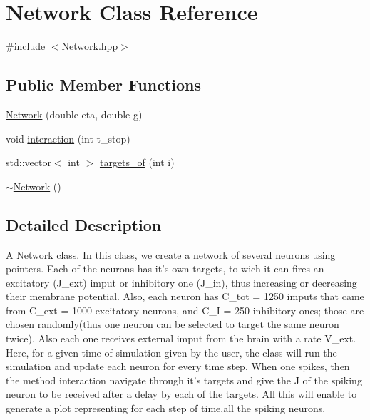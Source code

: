 \hypertarget{classNetwork}{\section{Network Class Reference}
\label{classNetwork}
}


{\ttfamily \#include $<$Network.\-hpp$>$}

\subsection*{Public Member Functions}
\begin{DoxyCompactItemize}
\item 
\hyperlink{classNetwork_a2316eb368da9bc4d33701de5617e7f0b}{Network} (double eta, double g)
\item 
void \hyperlink{classNetwork_a80a0df9ab1daa646388fe0f1457e964c}{interaction} (int t\-\_\-stop)
\item 
std\-::vector$<$ int $>$ \hyperlink{classNetwork_ac9d756463498db8a93c8ca23855029e6}{targets\-\_\-of} (int i)
\item 
\hyperlink{classNetwork_a7a4e19cdb4bf0c7ecf82baa643831492}{$\sim$\-Network} ()
\end{DoxyCompactItemize}


\subsection{Detailed Description}
A \hyperlink{classNetwork}{Network} class. In this class, we create a network of several neurons using pointers. Each of the neurons has it's own targets, to wich it can fires an excitatory (J\-\_\-ext) imput or inhibitory one (J\-\_\-in), thus increasing or decreasing their membrane potential. Also, each neuron has C\-\_\-tot = 1250 imputs that came from C\-\_\-ext = 1000 excitatory neurons, and C\-\_\-\-I = 250 inhibitory ones; those are chosen randomly(thus one neuron can be selected to target the same neuron twice). Also each one receives external imput from the brain with a rate V\-\_\-ext. Here, for a given time of simulation given by the user, the class will run the simulation and update each neuron for every time step. When one spikes, then the method interaction navigate through it's targets and give the J of the spiking neuron to be received after a delay by each of the targets. All this will enable to generate a plot representing for each step of time,all the spiking neurons. 

